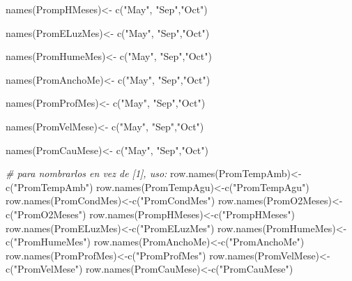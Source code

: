 \documentclass[
]{article}
\newenvironment{Shaded}{\begin{snugshade}}{\end{snugshade}}
\newcommand{\CommentTok}[1]{\textcolor[rgb]{0.56,0.35,0.01}{\textit{#1}}}
\newcommand{\FunctionTok}[1]{\textcolor[rgb]{0.00,0.00,0.00}{#1}}
\newcommand{\NormalTok}[1]{#1}
\newcommand{\OtherTok}[1]{\textcolor[rgb]{0.56,0.35,0.01}{#1}}
\newcommand{\StringTok}[1]{\textcolor[rgb]{0.31,0.60,0.02}{#1}}
\begin{document}
\begin{Shaded}
\begin{Highlighting}[]
\FunctionTok{names}\NormalTok{(PrompHMeses)}\OtherTok{\textless{}{-}} \FunctionTok{c}\NormalTok{(}\StringTok{"May"}\NormalTok{, }\StringTok{"Sep"}\NormalTok{,}\StringTok{"Oct"}\NormalTok{)}

\FunctionTok{names}\NormalTok{(PromELuzMes)}\OtherTok{\textless{}{-}} \FunctionTok{c}\NormalTok{(}\StringTok{"May"}\NormalTok{, }\StringTok{"Sep"}\NormalTok{,}\StringTok{"Oct"}\NormalTok{)}

\FunctionTok{names}\NormalTok{(PromHumeMes)}\OtherTok{\textless{}{-}} \FunctionTok{c}\NormalTok{(}\StringTok{"May"}\NormalTok{, }\StringTok{"Sep"}\NormalTok{,}\StringTok{"Oct"}\NormalTok{)}

\FunctionTok{names}\NormalTok{(PromAnchoMe)}\OtherTok{\textless{}{-}} \FunctionTok{c}\NormalTok{(}\StringTok{"May"}\NormalTok{, }\StringTok{"Sep"}\NormalTok{,}\StringTok{"Oct"}\NormalTok{)}

\FunctionTok{names}\NormalTok{(PromProfMes)}\OtherTok{\textless{}{-}} \FunctionTok{c}\NormalTok{(}\StringTok{"May"}\NormalTok{, }\StringTok{"Sep"}\NormalTok{,}\StringTok{"Oct"}\NormalTok{)}


\FunctionTok{names}\NormalTok{(PromVelMese)}\OtherTok{\textless{}{-}} \FunctionTok{c}\NormalTok{(}\StringTok{"May"}\NormalTok{, }\StringTok{"Sep"}\NormalTok{,}\StringTok{"Oct"}\NormalTok{)}


\FunctionTok{names}\NormalTok{(PromCauMese)}\OtherTok{\textless{}{-}} \FunctionTok{c}\NormalTok{(}\StringTok{"May"}\NormalTok{, }\StringTok{"Sep"}\NormalTok{,}\StringTok{"Oct"}\NormalTok{)}


\CommentTok{\# para nombrarlos en vez de [1], uso:}
\FunctionTok{row.names}\NormalTok{(PromTempAmb)}\OtherTok{\textless{}{-}}\FunctionTok{c}\NormalTok{(}\StringTok{"PromTempAmb"}\NormalTok{)}
\FunctionTok{row.names}\NormalTok{(PromTempAgu)}\OtherTok{\textless{}{-}}\FunctionTok{c}\NormalTok{(}\StringTok{"PromTempAgu"}\NormalTok{)}
\FunctionTok{row.names}\NormalTok{(PromCondMes)}\OtherTok{\textless{}{-}}\FunctionTok{c}\NormalTok{(}\StringTok{"PromCondMes"}\NormalTok{)}
\FunctionTok{row.names}\NormalTok{(PromO2Meses)}\OtherTok{\textless{}{-}}\FunctionTok{c}\NormalTok{(}\StringTok{"PromO2Meses"}\NormalTok{)}
\FunctionTok{row.names}\NormalTok{(PrompHMeses)}\OtherTok{\textless{}{-}}\FunctionTok{c}\NormalTok{(}\StringTok{"PrompHMeses"}\NormalTok{)}
\FunctionTok{row.names}\NormalTok{(PromELuzMes)}\OtherTok{\textless{}{-}}\FunctionTok{c}\NormalTok{(}\StringTok{"PromELuzMes"}\NormalTok{)}
\FunctionTok{row.names}\NormalTok{(PromHumeMes)}\OtherTok{\textless{}{-}}\FunctionTok{c}\NormalTok{(}\StringTok{"PromHumeMes"}\NormalTok{)}
\FunctionTok{row.names}\NormalTok{(PromAnchoMe)}\OtherTok{\textless{}{-}}\FunctionTok{c}\NormalTok{(}\StringTok{"PromAnchoMe"}\NormalTok{)}
\FunctionTok{row.names}\NormalTok{(PromProfMes)}\OtherTok{\textless{}{-}}\FunctionTok{c}\NormalTok{(}\StringTok{"PromProfMes"}\NormalTok{)}
\FunctionTok{row.names}\NormalTok{(PromVelMese)}\OtherTok{\textless{}{-}}\FunctionTok{c}\NormalTok{(}\StringTok{"PromVelMese"}\NormalTok{)}
\FunctionTok{row.names}\NormalTok{(PromCauMese)}\OtherTok{\textless{}{-}}\FunctionTok{c}\NormalTok{(}\StringTok{"PromCauMese"}\NormalTok{)}



\end{Highlighting}
\end{Shaded}
\end{document}
